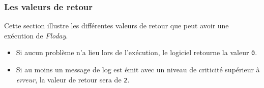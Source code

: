 \subsubsection{Les valeurs de retour}

Cette section illustre les différentes valeurs de retour que peut avoir une exécution de \emph{Floday}.

\begin{itemize}
	\item Si aucun problème n'a lieu lors de l'exécution, le logiciel retourne la valeur {\tt0}.
	\item Si au moins un message de log est émit avec un niveau de criticité supérieur à \emph{erreur}, la valeur de retour sera de {\tt2}.
\end{itemize}
